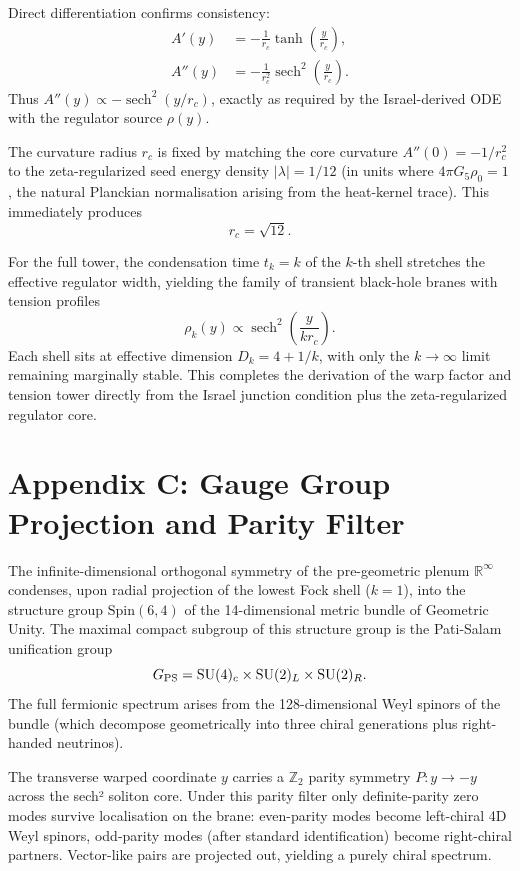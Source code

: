 \documentclass[11pt,a4paper,oneside]{article}
\newcommand{\sech}{\operatorname{sech}}
\begin{document}
Direct differentiation confirms consistency:
\begin{align*}
A'(y) &= -\frac{1}{r_c}\tanh\left(\frac{y}{r_c}\right), \\
A''(y) &= -\frac{1}{r_c^2}\sech^2\left(\frac{y}{r_c}\right).
\end{align*}
Thus $A''(y)\propto-\sech^2(y/r_c)$, exactly as required by the Israel-derived ODE with the regulator source $\rho(y)$.

The curvature radius $r_c$ is fixed by matching the core curvature $A''(0)=-1/r_c^2$ to the zeta-regularized seed energy density $|\lambda|=1/12$ (in units where $4\pi G_5\rho_0=1$, the natural Planckian normalisation arising from the heat-kernel trace). This immediately produces
\[
r_c = \sqrt{12}.
\]

For the full tower, the condensation time $t_k=k$ of the $k$-th shell stretches the effective regulator width, yielding the family of transient black-hole branes with tension profiles
\[
\rho_k(y)\propto\sech^2\left(\frac{y}{k r_c}\right).
\]
Each shell sits at effective dimension $D_k=4+1/k$, with only the $k\to\infty$ limit remaining marginally stable. This completes the derivation of the warp factor and tension tower directly from the Israel junction condition plus the zeta-regularized regulator core.

\section{Appendix C: Gauge Group Projection and Parity Filter}
\label{app:gauge}

The infinite-dimensional orthogonal symmetry of the pre-geometric plenum \(\mathbb{R}^\infty\) condenses, upon radial projection of the lowest Fock shell (\(k=1\)), into the structure group \(\mathrm{Spin}(6,4)\) of the 14-dimensional metric bundle of Geometric Unity. The maximal compact subgroup of this structure group is the Pati-Salam unification group
\[
G_{\rm PS} = \mathrm{SU}(4)_c \times \mathrm{SU}(2)_L \times \mathrm{SU}(2)_R.
\]
The full fermionic spectrum arises from the 128-dimensional Weyl spinors of the bundle (which decompose geometrically into three chiral generations plus right-handed neutrinos).  

The transverse warped coordinate \(y\) carries a \(\mathbb{Z}_2\) parity symmetry \(P: y \to -y\) across the sech² soliton core. Under this parity filter only definite-parity zero modes survive localisation on the brane: even-parity modes become left-chiral 4D Weyl spinors, odd-parity modes (after standard identification) become right-chiral partners. Vector-like pairs are projected out, yielding a purely chiral spectrum.
\end{document}
